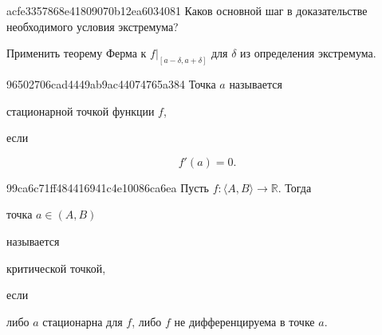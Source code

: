 
\begin{note}{acfe3357868e41809070b12ea6034081}
    Каков основной шаг в доказательстве необходимого условия экстремума?

    \begin{cloze}{1}
        Применить теорему Ферма к \( f|_{[a - \delta, a + \delta]}  \) для \( \delta \) из определения экстремума.
    \end{cloze}
\end{note}

\begin{note}{96502706cad4449ab9ac44074765a384}
    Точка \( a \) называется \begin{icloze}{1}стационарной точкой функции \( f \),\end{icloze} если
    \begin{icloze}{2}\[
        f'(a) = 0.
    \]\end{icloze}
\end{note}

\begin{note}{99ca6c71ff484416941c4e10086ca6ea}
    Пусть \( f : \langle A, B \rangle \to \mathbb R \). Тогда
    \begin{icloze}{1}точка \( a \in (A, B) \)\end{icloze} называется \begin{icloze}{2}критической
    точкой,\end{icloze} если \begin{icloze}{1}либо \( a \) стационарна для \( f \), либо \(
    f \) не дифференцируема в точке \( a \).\end{icloze}
\end{note}

